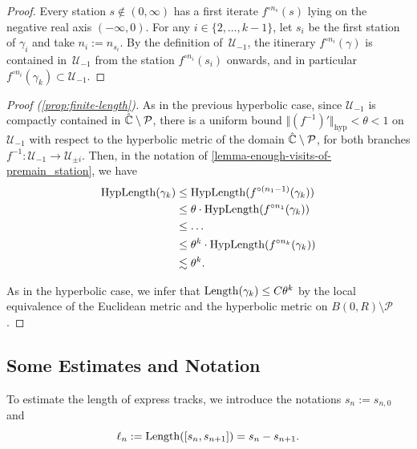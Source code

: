 \begin{proof}
	Every station $s \not \in (0, \infty)$ has a first iterate $f^{\circ n_s}(s)$ lying on the negative real axis $(-\infty, 0)$.
	For any $i \in \{2, \dots, k-1\}$, let $s_i$ be the first station of $\gamma _i$ and take $n_i := n_{s_i}$.
	By the definition of $\,\mathcal U_{-1}$, the itinerary $f^{\circ n_i}(\gamma)$ is contained in  $\,\mathcal U_{-1}$ from the station $f^{\circ n_i}(s_i)$ onwards, and in particular $f^{\circ n_i}(\gamma_k) \subset \mathcal U_{-1}$.
\end{proof}
\begin{proof}[Proof (\cref{prop:finite-length})] 
	As in the previous hyperbolic case,
since $\mathcal U_{-1}$ is compactly contained in $\hat{\mathbb C} \setminus \operatorname{\mathcal P}$, there is a uniform bound $\Vert (f^{-1})' \Vert _{\mathrm{hyp}}< \theta < 1$ on $\mathcal U_{-1}$
with respect to the hyperbolic metric of the domain $\hat{\mathbb C} \setminus \operatorname{\mathcal P}$, for both branches $f^{-1}: \mathcal U_{-1} \to \mathcal U_{\pm i}$. 
Then, in the notation of \cref{lemma-enough-visits-of-premain_station}, we have 
\begin{equation}
	\begin{split}
	\operatorname{HypLength}(\gamma_k)  &  \leq \operatorname{HypLength}(f^{\circ (n_1-1)}(\gamma_k)) \\ & \leq \theta \cdot \operatorname{HypLength}(f^{\circ n_1}(\gamma_k))\\ & \leq  \dots
	\\ & \leq \theta^k \cdot \operatorname{HypLength}(f^{\circ n_k}(\gamma_k))
		\\ & \lesssim \theta^k.
	\end{split}
\end{equation}

As in the hyperbolic case, we infer that $\operatorname{Length}(\gamma_k) \leq C \theta^k$ 
by the local equivalence of the Euclidean metric and the hyperbolic metric on $B(0,R) \setminus \mathcal P$. 
\end{proof}


\subsection{Some Estimates and Notation}

To estimate the length of express tracks, we introduce the notations $s_n := s_{n, 0}$ and 
\begin{equation}
	\ell_n := \operatorname{Length}([s_{n},s_{n+1}]) = s_{n}-s_{n+1}.
\end{equation}

